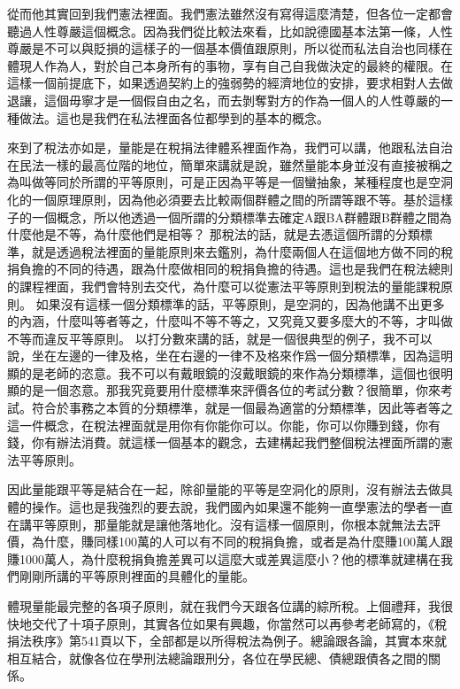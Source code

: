 \documentclass[]{ctexbook}
\begin{document}
從而他其實回到我們憲法裡面。我們憲法雖然沒有寫得這麼清楚，但各位一定都會聽過人性尊嚴這個概念。因為我們從比較法來看，比如說德國基本法第一條，人性尊嚴是不可以與貶損的這樣子的一個基本價值跟原則，所以從而私法自治也同樣在體現人作為人，對於自己本身所有的事物，享有自己自我做決定的最終的權限。在這樣一個前提底下，如果透過契約上的強弱勢的經濟地位的安排，要求相對人去做退讓，這個毋寧才是一個假自由之名，而去剝奪對方的作為一個人的人性尊嚴的一種做法。這也是我們在私法裡面各位都學到的基本的概念。

來到了稅法亦如是，量能是在稅捐法律體系裡面作為，我們可以講，他跟私法自治在民法一樣的最高位階的地位，簡單來講就是說，雖然量能本身並沒有直接被稱之為叫做等同於所謂的平等原則，可是正因為平等是一個蠻抽象，某種程度也是空洞化的一個原理原則，因為他必須要去比較兩個群體之間的所謂等跟不等。基於這樣子的一個概念，所以他透過一個所謂的分類標準去確定A跟BA群體跟B群體之間為什麼他是不等，為什麼他們是相等？ 那稅法的話，就是去憑這個所謂的分類標準，就是透過稅法裡面的量能原則來去鑑別，為什麼兩個人在這個地方做不同的稅捐負擔的不同的待遇，跟為什麼做相同的稅捐負擔的待遇。這也是我們在稅法總則的課程裡面，我們會特別去交代，為什麼可以從憲法平等原則到稅法的量能課稅原則。
如果沒有這樣一個分類標準的話，平等原則，是空洞的，因為他講不出更多的內涵，什麼叫等者等之，什麼叫不等不等之，又究竟又要多麼大的不等，才叫做不等而違反平等原則。
以打分數來講的話，就是一個很典型的例子，我不可以說，坐在左邊的一律及格，坐在右邊的一律不及格來作爲一個分類標準，因為這明顯的是老師的恣意。我不可以有戴眼鏡的沒戴眼鏡的來作為分類標準，這個也很明顯的是一個恣意。那我究竟要用什麼標準來評價各位的考試分數？很簡單，你來考試。符合於事務之本質的分類標準，就是一個最為適當的分類標準，因此等者等之這一件概念，在稅法裡面就是用你有你能你可以。你能，你可以你賺到錢，你有錢，你有辦法消費。就這樣一個基本的觀念，去建構起我們整個稅法裡面所謂的憲法平等原則。

因此量能跟平等是結合在一起，除卻量能的平等是空洞化的原則，沒有辦法去做具體的操作。這也是我強烈的要去說，我們國內如果還不能夠一直學憲法的學者一直在講平等原則，那量能就是讓他落地化。沒有這樣一個原則，你根本就無法去評價，為什麼，賺同樣100萬的人可以有不同的稅捐負擔，或者是為什麼賺100萬人跟賺1000萬人，為什麼稅捐負擔差異可以這麼大或差異這麼小？他的標準就建構在我們剛剛所講的平等原則裡面的具體化的量能。

體現量能最完整的各項子原則，就在我們今天跟各位講的綜所稅。上個禮拜，我很快地交代了十項子原則，其實各位如果有興趣，你當然可以再參考老師寫的，《稅捐法秩序》第541頁以下，全部都是以所得稅法為例子。總論跟各論，其實本來就相互結合，就像各位在學刑法總論跟刑分，各位在學民總、債總跟債各之間的關係。
\end{document}
